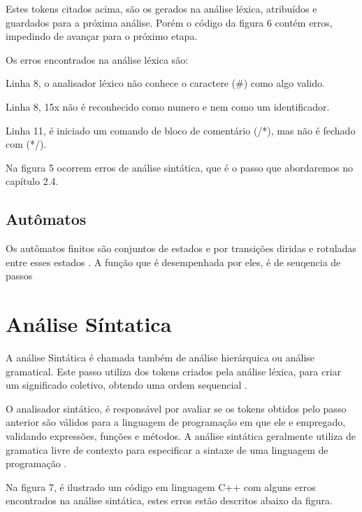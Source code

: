 \documentclass[12pt,oneside,a4paper,chapter=TITLE,section=TITLE,sumario=tradicional]{abntex2}
\begin{document}
Estes tokens citados acima, são os gerados na análise léxica, atribuídos e guardados para a próxima análise. Porém o código da figura 6 contém erros, impedindo de avançar para o próximo etapa.

Os erros encontrados na análise léxica são:

\begin{lista}
	\item Linha 8, o analisador léxico não conhece o caractere (\#) como algo valido.
	\item Linha 8, 15x não é reconhecido como numero e nem como um identificador.
	\item Linha 11, é iniciado um comando de bloco de comentário (/*), mas não é fechado com (*/).
\end{lista}

Na figura 5 ocorrem erros de análise sintática, que é o passo que abordaremos no capítulo 2.4.

\subsection{Autômatos}
\label{sec:automatos}

Os autômatos finitos são conjuntos de estados e por transições diridas e rotuladas entre esses estados \cite{pedro2018}. A função que é desempenhada por eles, é de seuqencia de passos

\section{Análise Síntatica}
\label{sec:analise-sintatica}

A análise Sintática é chamada também de análise hierárquica ou análise gramatical. Este passo utiliza dos tokens criados pela análise léxica, para criar um significado coletivo, obtendo uma ordem sequencial \cite{alfred1995}.

O analisador sintático, é responsável por avaliar se os tokens obtidos pelo passo anterior são válidos para a linguagem de programação em que ele e empregado, validando expressões, funções e métodos. A análise sintática geralmente utiliza de gramatica livre de contexto para especificar a sintaxe de uma linguagem de programação \cite{maragon2015}.

Na figura 7, é ilustrado um código em linguagem C++ com alguns erros encontrados na análise sintática, estes erros estão descritos abaixo da figura.

\begin{figure}[htb]
\end{figure}
\end{document}
